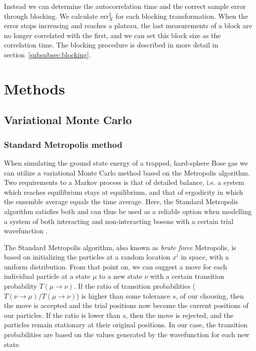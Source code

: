 \documentclass[
    a4paper, aps, twocolumn, floatfix, superscriptaddress,
    nofootinbib]{revtex4-1}
\begin{document}
Instead we can determine the autocorrelation time and the correct sample error through blocking. We calculate ${\text{err}}_X^2$ for each blocking transformation. When the error stops increasing and reaches a plateau, the last measurements of a block are no longer correlated with the first, and we can set this block size as the correlation time. The blocking procedure is described in more detail in section~\ref{subsubsec:blocking}.


\section{Methods}\label{sec:Methods}
\subsection{Variational Monte Carlo}
\subsubsection{Standard Metropolis method}\label{subsubsec:brute-force}
When simulating the ground state energy of a trapped, hard-sphere Bose gas we can utilize a variational Monte Carlo method based on the Metropolis algorithm. Two requirements to a Markov process is that of detailed balance, i.e. a system which reaches equilibrium stays at equilibrium, and that of ergodicity in which the ensemble average equals the time average. Here, the Standard Metropolis algorithm satisfies both and can thus be used as a reliable option when modelling a system of both interacting and non-interacting bosons with a certain trial wavefunction \cite{notes}.

The Standard Metropolis algorithm, also known as \textit{brute force} Metropolis, is based on initializing the particles at a random location $x^i$ in space, with a uniform distribution. From that point on, we can suggest a move for each individual particle at a state $\mu$ to a new state $\nu$ with a certain transition probability $T(\mu\rightarrow \nu)$. If the ratio of transition probabilities ($T(\nu\rightarrow \mu)/T(\mu\rightarrow \nu)$) is higher than some tolerance $s$, of our choosing, then the move is accepted and the trial positions now become the current positions of our particles. If the ratio is lower than $s$, then the move is rejected, and the particles remain stationary at their original positions. In our case, the transition probabilities are based on the values generated by the wavefunction for each new state.
\end{document}
